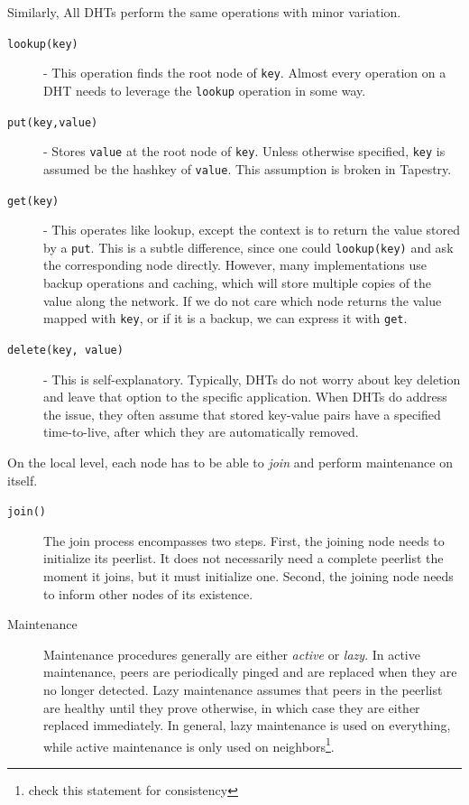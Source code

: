 Similarly, All DHTs perform the same operations with minor variation.
\begin{description}
	\item[\texttt{lookup(key)}] - This operation finds the root node of \texttt{key}.
	Almost every operation on a DHT needs to leverage the \texttt{lookup} operation in some way.
	\item[\texttt{put(key,value)}] - Stores \texttt{value} at the root node of \texttt{key}.
	Unless otherwise specified, \texttt{key} is assumed be the hashkey of \texttt{value}.
	This assumption is broken in Tapestry.
	\item[\texttt{get(key)}] - This operates like lookup, except the context is to return the value stored by a \texttt{put}.
	This is a subtle difference, since one could \texttt{lookup(key)} and ask the corresponding node directly.
	However, many implementations use backup operations and caching, which will store multiple copies of the value along the network.
	If we do not care which node returns the value mapped with \texttt{key}, or if it is a backup,  we can express it with \texttt{get}.
	\item[\texttt{delete(key, value)}] - This is self-explanatory.  Typically, DHTs do not worry about key deletion and leave that option to the specific application.
    When DHTs do address the issue, they often assume that stored key-value pairs have a specified time-to-live, after which they are automatically removed.
\end{description}

On the local level, each node has to be able to \textit{join }and perform maintenance on itself.
\begin{description}
	\item[\texttt{join()}]  The join process encompasses two steps.
    First, the joining node needs to initialize its peerlist. 
    It does not necessarily need a complete peerlist the moment it joins, but it must initialize one. 
    Second, the joining node needs to inform other nodes of its existence.
    \item[Maintenance]  Maintenance procedures generally are either \textit{active} or \textit{lazy}.
    In active maintenance, peers are periodically pinged and are replaced when they are no longer detected.
    Lazy maintenance assumes that peers in the peerlist are healthy until they prove otherwise, in which case they are either replaced immediately.
    In general, lazy maintenance is used on everything, while active maintenance is only used on neighbors\footnote{check this statement for consistency}.
    
\end{description}

